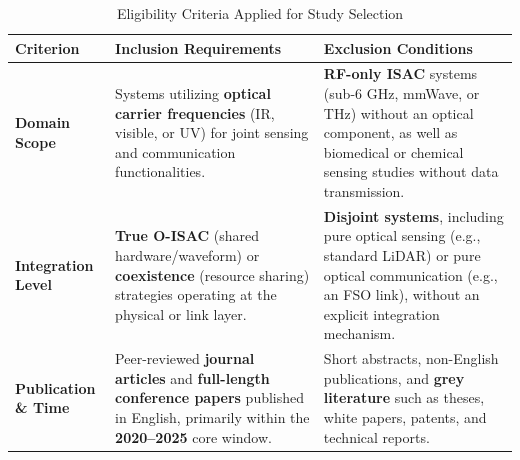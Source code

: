 \documentclass[letterpaper,journal]{IEEEtran}
\begin{document}
\begin{table}[!t]
    \caption{Eligibility Criteria Applied for Study Selection}
    \label{tab:iii1}
    \centering
    \footnotesize
    \begin{tabularx}{\textwidth}{@{}>{\raggedright\arraybackslash}p{2.1cm} >{\raggedright\arraybackslash}X >{\raggedright\arraybackslash}X@{}}
        \toprule
        \textbf{Criterion}                                                                                                                                                                 &
        \textbf{Inclusion Requirements}                                                                                                                                                    &
        \textbf{Exclusion Conditions}                                                                                                                                                        \\
        \midrule

        \textbf{Domain Scope}                                                                                                                                                              &
        Systems utilizing \textbf{optical carrier frequencies} (IR, visible, or UV) for joint sensing and communication functionalities.                                                   &
        \textbf{RF-only ISAC} systems (sub-6 GHz, mmWave, or THz) without an optical component, as well as biomedical or chemical sensing studies without data transmission.                 \\

        \textbf{Integration Level}                                                                                                                                                         &
        \textbf{True O-ISAC} (shared hardware/waveform) or \textbf{coexistence} (resource sharing) strategies operating at the physical or link layer.                                     &
        \textbf{Disjoint systems}, including pure optical sensing (e.g., standard LiDAR) or pure optical communication (e.g., an FSO link), without an explicit integration mechanism.       \\

        \textbf{Publication \& Time}                                                                                                                                                       &
        Peer-reviewed \textbf{journal articles} and \textbf{full-length conference papers} published in English, primarily within the \textbf{2020--2025} core window.                     &
        Short abstracts, non-English publications, and \textbf{grey literature} such as theses, white papers, patents, and technical reports.                                                \\


\end{tabularx}
\end{table}
\end{document}
